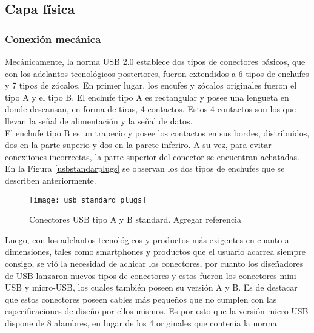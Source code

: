 \subsection{Capa física}
	\subsubsection{Conexión mecánica}
		Mecánicamente, la norma USB 2.0 establece dos tipos de conectores básicos, que con los adelantos tecnológicos posteriores, fueron extendidos a 6 tipos de enchufes y 7 tipos de zócalos.
		En primer lugar, los encufes y zócalos originales fueron el tipo A y el tipo B. El enchufe tipo A es rectangular y posee una lengueta en donde descansan, en forma de tiras, 4 contactos. Estos 4 contactos son los que llevan la señal de alimentación y la señal de datos.\\
		El enchufe tipo B es un trapecio y posee los contactos en sus bordes, distribuidos, dos en la parte superio y dos en la parete inferiro. A su vez, para evitar conexiiones incorrectas, la parte superior del conector se encuentran achatadas. En la Figura \ref{usbstandarplugs} se observan los dos tipos de enchufes que se describen anteriormente.\\
		
		\begin{figure}[h]
			\centering
			\texttt{[image: usb\_standard\_plugs]}
			\caption{Conectores USB tipo A y B standard. Agregar referencia}
			\label{usbstandardplugs}
		\end{figure}
		
		Luego, con los adelantos tecnológicos y productos más exigentes en cuanto a dimensiones, tales como smartphones y productos que el usuario acarrea siempre consigo, se vió la necesidad de achicar los conectores, por cuanto los diseñadores de USB lanzaron nuevos tipos de conectores y estos fueron los conectores mini-USB y micro-USB, los cuales también poseen su versión A y B. Es de destacar que estos conectores poseen cables más pequeños que no cumplen con las especificaciones de diseño por ellos mismos. Es por esto que la versión micro-USB dispone de 8 alambres, en lugar de los 4 originales que contenía la norma